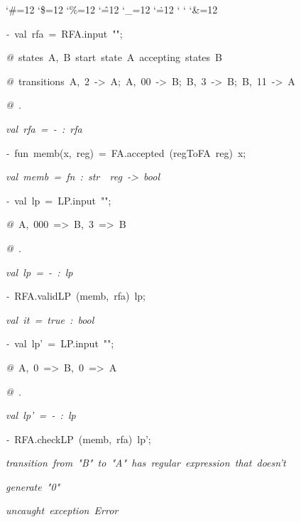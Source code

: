 \begin{list}{}
{\setlength{\leftmargin}{\leftmargini}
\setlength{\rightmargin}{0cm}
\setlength{\itemindent}{0cm}
\setlength{\listparindent}{0cm}
\setlength{\itemsep}{0cm}
\setlength{\parsep}{0cm}
\setlength{\labelsep}{0cm}
\setlength{\labelwidth}{0cm}
\catcode`\#=12
\catcode`\$=12
\catcode`\%=12
\catcode`\^=12
\catcode`\_=12
\catcode`\.=12
\catcode`
\catcode`
\catcode`\&=12
\ttfamily}
\small
\item[]\textsl{-\ }val\ rfa\ =\ RFA.input\ "";
\item[]\textsl{@\ }states\ A,\ B\ start\ state\ A\ accepting\ states\ B
\item[]\textsl{@\ }transitions\ A,\ 2\ ->\ A;\ A,\ 00\ ->\ B;\ B,\ 3\ ->\ B;\ B,\ 11\ ->\ A
\item[]\textsl{@\ }.
\item[]\textsl{val\ rfa\ =\ -\ :\ rfa}
\item[]\textsl{-\ }fun\ memb(x,\ reg)\ =\ FA.accepted\ (regToFA\ reg)\ x;
\item[]\textsl{val\ memb\ =\ fn\ :\ str\ \ reg\ ->\ bool}
\item[]\textsl{-\ }val\ lp\ =\ LP.input\ "";
\item[]\textsl{@\ }A,\ 000\ =>\ B,\ 3\ =>\ B
\item[]\textsl{@\ }.
\item[]\textsl{val\ lp\ =\ -\ :\ lp}
\item[]\textsl{-\ }RFA.validLP\ (memb,\ rfa)\ lp;
\item[]\textsl{val\ it\ =\ true\ :\ bool}
\item[]\textsl{-\ }val\ lp'\ =\ LP.input\ "";
\item[]\textsl{@\ }A,\ 0\ =>\ B,\ 0\ =>\ A
\item[]\textsl{@\ }.
\item[]\textsl{val\ lp'\ =\ -\ :\ lp}
\item[]\textsl{-\ }RFA.checkLP\ (memb,\ rfa)\ lp';
\item[]\textsl{transition\ from\ "B"\ to\ "A"\ has\ regular\ expression\ that\ doesn't}
\item[]\textsl{generate\ "0"}
\item[]
\item[]\textsl{uncaught\ exception\ Error}
\end{list}
